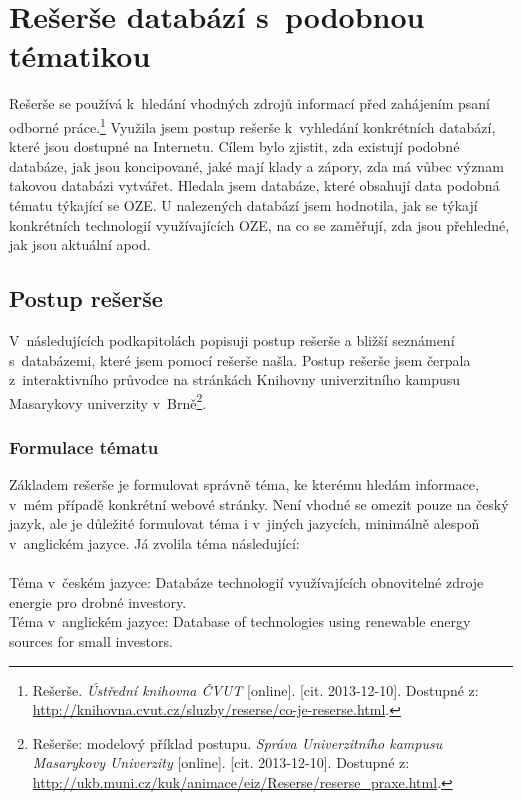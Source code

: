 \documentclass[11pt,a4paper]{article}
\begin{document}
\newpage
\section{Rešerše databází s~podobnou tématikou}
Rešerše se používá k~hledání vhodných zdrojů informací před zahájením psaní odborné práce.\footnote{Rešerše. \textit{Ústřední knihovna ČVUT} [online]. [cit. 2013-12-10]. Dostupné z: \url{http://knihovna.cvut.cz/sluzby/reserse/co-je-reserse.html}.}  Využila jsem postup rešerše k~vyhledání konkrétních databází, které jsou dostupné na Internetu. Cílem bylo zjistit, zda existují podobné databáze, jak jsou koncipované, jaké mají klady a zápory, zda má vůbec význam takovou databázi vytvářet. Hledala jsem databáze, které obsahují data podobná tématu týkající se OZE.  U nalezených databází jsem hodnotila, jak se týkají konkrétních technologií využívajících OZE, na co se zaměřují, zda jsou přehledné, jak jsou aktuální apod.

\subsection{Postup rešerše}
V~následujících podkapitolách popisuji postup rešerše a bližší seznámení s~databázemi, které jsem pomocí rešerše našla. Postup rešerše jsem čerpala z~interaktivního průvodce na stránkách Knihovny univerzitního kampusu Masarykovy univerzity v~Brně\footnote{Rešerše: modelový příklad postupu. \textit{Správa Univerzitního kampusu Masarykovy Univerzity} [online]. [cit. 2013-12-10]. Dostupné z: \url{http://ukb.muni.cz/kuk/animace/eiz/Reserse/reserse_praxe.html}.}.

\subsubsection{Formulace tématu} 
Základem rešerše je formulovat správně téma, ke kterému hledám informace, v~mém případě konkrétní webové stránky. Není vhodné se omezit pouze na český jazyk, ale je důležité formulovat téma i v~jiných jazycích, minimálně alespoň v~anglickém jazyce. Já zvolila téma následující:\\\\
Téma v~českém jazyce: Databáze technologií využívajících obnovitelné zdroje energie pro drobné investory.\\
Téma v~anglickém jazyce: Database of technologies using renewable energy sources for small investors.
\end{document}
